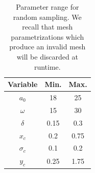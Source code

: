 \documentclass[../../thesis.tex]{subfiles}
\begin{document}
\begin{table}[h]
    \centering
    \caption{Parameter range for random sampling.
    We recall that mesh parametrizations which produce an invalid mesh
    will be discarded at runtime.}
    \begin{tabular}{ccc}
    \toprule
        Variable   & Min. & Max. \\ 
        \midrule
        $a_0$      & 18      & 25      \\
        $\omega$   & 15      & 30      \\
        $\delta$   & 0.15    & 0.3     \\
        \midrule
        $x_c$      & 0.2     & 0.75    \\
        $\sigma_c$ & 0.1     & 0.2     \\
        $y_c$      & 0.25    & 1.75    \\
        \bottomrule
    \end{tabular}
    \label{tab:parameter_range}
\end{table}
\end{document}
